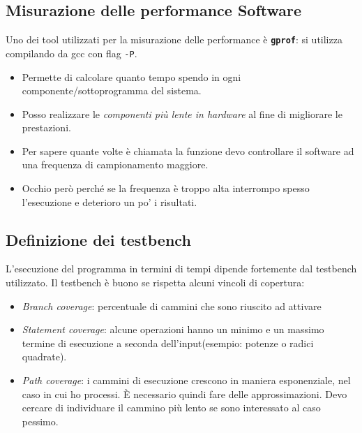 \documentclass[a4paper]{article}
\theoremstyle{definition}
\begin{document}
		\subsection{Misurazione delle performance Software}
			Uno dei tool utilizzati per la misurazione delle performance è \textbf{\lstinline|gprof|}: si utilizza compilando da gcc con flag \lstinline|-P|. 
			\begin{itemize}
				\item Permette di calcolare quanto tempo spendo in ogni componente/sottoprogramma del sistema. 
				\item Posso realizzare le \textit{componenti più lente in hardware} al fine di migliorare le prestazioni. 
				\item Per sapere quante volte è chiamata la funzione devo controllare il software ad una frequenza di campionamento maggiore. 
				\item Occhio però perché se la frequenza è troppo alta interrompo spesso l'esecuzione e deterioro un po' i risultati.
			\end{itemize}
			
		\subsection{Definizione dei testbench}
			L'esecuzione del programma in termini di tempi dipende fortemente dal testbench utilizzato. Il testbench è buono se rispetta alcuni vincoli di copertura:
			\begin{itemize}
				\item \textit{Branch coverage}: percentuale di cammini che sono riuscito ad attivare
				\item \textit{Statement coverage}: alcune operazioni hanno un minimo e un massimo termine di esecuzione a seconda dell'input(esempio: potenze o radici quadrate).
				\item \textit{Path coverage}: i cammini di esecuzione crescono in maniera esponenziale, nel caso in cui ho processi. È necessario quindi fare delle approssimazioni. Devo cercare di individuare il cammino più lento se sono interessato al caso pessimo.
			\end{itemize}
			
\end{document}
